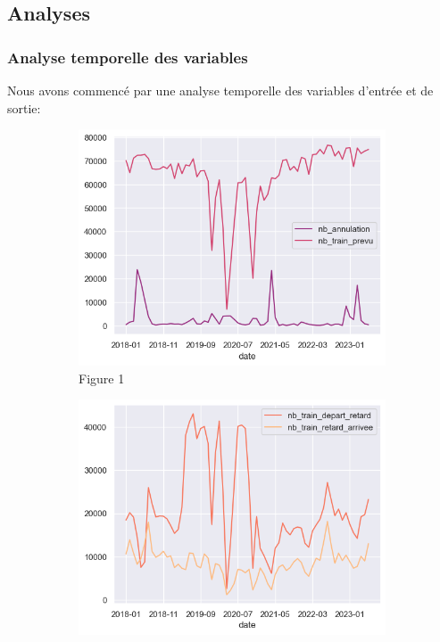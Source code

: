 \documentclass{article}
\begin{document}
\subsection{Analyses}

\subsubsection{Analyse temporelle des variables}
Nous avons commencé par une analyse temporelle des variables d'entrée et de sortie:

\begin{figure}[H]
    \begin{subfigure}{0.3\textwidth}
        \includegraphics[width=\linewidth]{annules_prevus_tmp.png}
        \caption{Figure 1}
    \end{subfigure}
    \begin{subfigure}{0.3\textwidth}
        \includegraphics[width=\linewidth]{retard_tmp.png}

\end{subfigure}
\end{figure}
\end{document}
